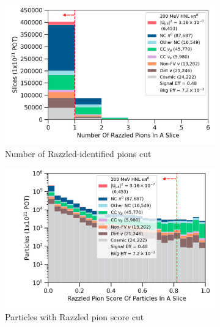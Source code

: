 \begin{figure}[ht!]
\begin{subfigure}[b]{0.495\textwidth}
            \includegraphics[width=\textwidth]{nrazzled_pion_precut}
            \caption{Number of Razzled-identified pions cut}%
            \label{fig:nrazzled_pion_full}
        \end{subfigure}
        \hfill
        \begin{subfigure}[b]{0.495\textwidth}   
            \centering 
            \includegraphics[width=\textwidth]{razzled_pion_score_precut}
            \caption{Particles with Razzled pion score cut}%
            \label{fig:razzled_pion_score_full}
        \end{subfigure}
	\hfill
        \begin{subfigure}[b]{0.495\textwidth}   
            \centering 

\end{subfigure}
\end{figure}
